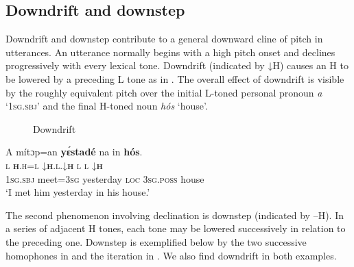 \subsection{Downdrift and downstep}\label{sec:3.2.3}

Downdrift and downstep contribute to a general downward cline of pitch in utterances. An utterance normally begins with a high pitch onset and declines progressively with every lexical tone. Downdrift (indicated by ↓H) causes an H to be lowered by a preceding L tone as in . The overall effect of downdrift is visible by the roughly equivalent pitch over the initial L-toned personal pronoun \textit{a} ‘\textsc{1sg.sbj}’ and the final H-toned noun \textit{hós} ‘house’.

\begin{figure}
\caption{Downdrift}
\label{fig:key:3.16}
\end{figure}


\ea%
    \label{ex:key:55}
    \glll   A    mítɔp=an  \textbf{yɛ́stadé}    na  in  \textbf{hós}.\\
\textsc{l}    \textbf{\textmd{\textsc{h}}}\textsc{.h=l}    \textsc{↓}\textbf{\textsc{h}}\textsc{.l.↓}\textbf{\textsc{h}}    \textsc{l}  \textsc{l}  \textsc{↓}\textbf{\textsc{h}} \\
\textsc{1sg.sbj}  meet=\textsc{3sg}  yesterday  \textsc{loc}  \textsc{3sg.poss}  house\\
\glt ‘I met him yesterday in his house.’    
\z


The second phenomenon involving declination is downstep (indicated by –H). In a series of adjacent H tones, each tone may be lowered successively in relation to the preceding one. Downstep is exemplified below by the two successive homophones in  and the iteration in . We also find downdrift in both examples.

